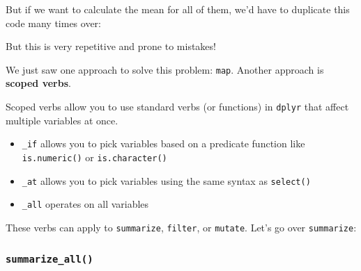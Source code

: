 \documentclass[]{book}
\newenvironment{Shaded}{\begin{snugshade}}{\end{snugshade}}
\newcommand{\KeywordTok}[1]{\textcolor[rgb]{0.13,0.29,0.53}{\textbf{#1}}}
\newcommand{\DataTypeTok}[1]{\textcolor[rgb]{0.13,0.29,0.53}{#1}}
\newcommand{\StringTok}[1]{\textcolor[rgb]{0.31,0.60,0.02}{#1}}
\newcommand{\CommentTok}[1]{\textcolor[rgb]{0.56,0.35,0.01}{\textit{#1}}}
\newcommand{\OperatorTok}[1]{\textcolor[rgb]{0.81,0.36,0.00}{\textbf{#1}}}
\newcommand{\NormalTok}[1]{#1}
\providecommand{\tightlist}{%
  \setlength{\itemsep}{0pt}\setlength{\parskip}{0pt}}
\begin{document}
But if we want to calculate the mean for all of them, we'd have to
duplicate this code many times over:

\begin{Shaded}
\end{Shaded}

But this is very repetitive and prone to mistakes!

We just saw one approach to solve this problem: \texttt{map}. Another
approach is \textbf{scoped verbs}.

Scoped verbs allow you to use standard verbs (or functions) in
\texttt{dplyr} that affect multiple variables at once.

\begin{itemize}
\tightlist
\item
  \texttt{\_if} allows you to pick variables based on a predicate
  function like \texttt{is.numeric()} or \texttt{is.character()}
\item
  \texttt{\_at} allows you to pick variables using the same syntax as
  \texttt{select()}
\item
  \texttt{\_all} operates on all variables
\end{itemize}

These verbs can apply to \texttt{summarize}, \texttt{filter}, or
\texttt{mutate}. Let's go over \texttt{summarize}:

\subsubsection*{\texorpdfstring{\texttt{summarize\_all()}}{summarize\_all()}}\label{summarize_all}
\end{document}
